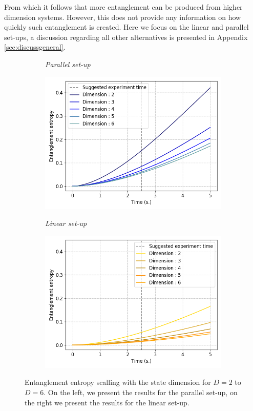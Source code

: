 \documentclass[%
 reprint,
 superscriptaddress,
 amsmath,
 amssymb,
 aps,
 longbibliography
]{revtex4-2}
\begin{document}
From which it follows that more entanglement can be produced from higher dimension systems. However, this does not provide any information on how quickly such entanglement is created. Here we focus on the linear and parallel set-ups, a discussion regarding all other alternatives is presented in Appendix \ref{sec:discussgeneral}. \\
	\begin{figure}
	    \begin{subfigure}{.49\textwidth}
	        \textit{Parallel set-up}\par\medskip
    		\includegraphics[width=1.\columnwidth]{para_qudits.png}\par\medskip
		\end{subfigure}
	    \begin{subfigure}{.49\textwidth}
	        \textit{Linear set-up}\par\medskip
    		\includegraphics[width=1.\columnwidth]{linear_qudits.png}\par\medskip
		\end{subfigure}
		\caption{Entanglement entropy scalling with the state dimension for $D=2$ to $D=6$. On the left, we present the results for the parallel set-up, on the right we present the results for the linear set-up.} \label{para_qudits}
	\end{figure}
\end{document}
